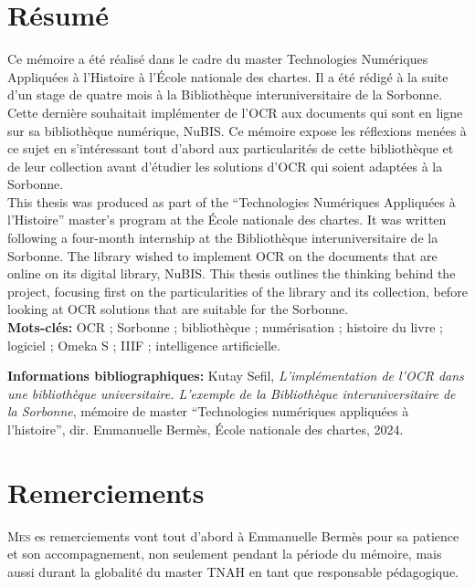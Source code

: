 \documentclass[a4paper,12pt,twoside]{book}
\begin{document}
	\chapter{Résumé}
\medskip
	Ce mémoire a été réalisé dans le cadre du master Technologies Numériques Appliquées à l'Histoire à l’École nationale des chartes. Il a été rédigé à la suite d’un stage de quatre mois à la Bibliothèque interuniversitaire de la Sorbonne. Cette dernière souhaitait implémenter de l’OCR aux documents qui sont en ligne sur sa bibliothèque numérique, NuBIS. Ce mémoire expose les réflexions menées à ce sujet en s’intéressant tout d’abord aux particularités de cette bibliothèque et de leur collection avant d’étudier les solutions d’OCR qui soient adaptées à la Sorbonne.\\
	
	This thesis was produced as part of the “Technologies Numériques Appliquées à l'Histoire” master's program at the École nationale des chartes. It was written following a four-month internship at the Bibliothèque interuniversitaire de la Sorbonne. The library wished to implement OCR on the documents that are online on its digital library, NuBIS. This thesis outlines the thinking behind the project, focusing first on the particularities of the library and its collection, before looking at OCR solutions that are suitable for the Sorbonne.\\ 
	
	\textbf{Mots-clés:} OCR ; Sorbonne ; bibliothèque ; numérisation ; histoire du livre ; logiciel ; Omeka S ; IIIF ; intelligence artificielle.
	
	\textbf{Informations bibliographiques:} Kutay Sefil, \textit{L’implémentation de l’OCR dans une bibliothèque universitaire. L’exemple de la Bibliothèque interuniversitaire de la Sorbonne}, mémoire de master \enquote{Technologies numériques appliquées à l'histoire}, dir. Emmanuelle Bermès, École nationale des chartes, 2024.
	
		\newpage{\pagestyle{empty}\cleardoublepage}
	
	\chapter{Remerciements}
	
\lettrine{M}{es} es remerciements vont tout d’abord à Emmanuelle Bermès pour sa patience et son accompagnement, non seulement pendant la période du mémoire, mais aussi durant la globalité du master TNAH en tant que responsable pédagogique.\\
\end{document}
